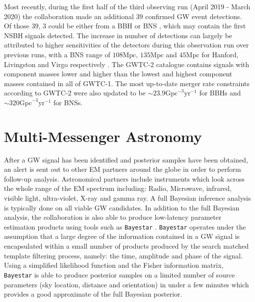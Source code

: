 %
%
Most recently, during the first half of the third observing run 
(April 2019 - March 2020) the collaboration made an 
additional $39$ confirmed \ac{GW} event detections. Of those $39$, 
3 could be either from a \ac{BBH} 
or \ac{BNS} \cite{1811.12907, 2010.14527}, which may contain the first 
\ac{NSBH} signals detected. The increase in number of 
detections can largely be attributed to higher sensitivities of the 
detectors during this observation run over previous runs, with a \ac{BNS} range 
of $108 \mathrm{Mpc}$, $135 \mathrm{Mpc}$ and $45 \mathrm{Mpc}$ 
for Hanford, Livingston and Virgo respectively \cite{2010.14527}. The 
GWTC-2 catalogue contains signals with component masses lower and higher 
than the lowest and highest component masses contained in all of 
GWTC-1. The most up-to-date merger rate constraints according to GWTC-2 were 
also updated to be $\sim 23.9 \mathrm{Gpc}^{-3} \mathrm{yr}^{-1}$ for 
\ac{BBH}s and $\sim 320 \mathrm{Gpc}^{-3} \mathrm{yr}^{-1}$ for 
\ac{BNS}s.

%
%



\section{Multi-Messenger Astronomy}

After a \ac{GW} signal has been identified and posterior samples have 
been obtained, an alert is sent out to other \ac{EM} partners around the 
globe in order to perform follow-up analysis. Astronomical partners include instruments which look across 
the whole range of the \ac{EM} spectrum including: Radio, Microwave, 
infrared, visible light, ultra-violet, X-ray and gamma ray. A full Bayesian 
inference analysis is typically done on all viable \ac{GW} candidates. In 
addition to the full Bayesian analysis, the collaboration is also able 
to produce low-latency parameter estimation products using tools such as \texttt{Bayestar} \cite{2016PhRvD..93b4013S}. \texttt{Bayestar} operates under the 
assumption that a large degree of the information contained in a \ac{GW} 
signal is encapsulated within a small number of products produced by the 
search matched template filtering process, namely: the time, amplitude 
and phase of the signal. Using a simplified likelihood function and the 
Fisher information matrix, \texttt{Bayestar} is able to produce posterior 
samples on a limited number of source parameters (sky location, distance and orientation) 
in under a few minutes which provides a good approximate of the full 
Bayesian posterior.

